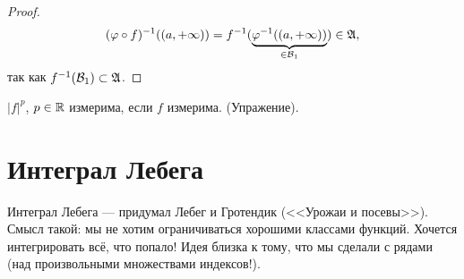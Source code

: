 \begin{proof}
 \begin{align*}
  (\varphi \circ f)^{-1} ((a, +\infty)) = f^{-1} ( \underbrace{\varphi^{-1}((a, +\infty))}_{\in \mathcal{B}_1} ) \in \mathfrak{A}
 ,\end{align*} так как $f^{-1}(\mathcal{B}_1) \subset \mathfrak{A}$.
\end{proof}
\begin{crly}
 $\left| f \right|^{p}$, $p \in \mathbb{R}$ измерима, если $f$ измерима. (Упражение).
\end{crly}

\section{Интеграл Лебега}

Интеграл Лебега --- придумал Лебег и Гротендик (<<Урожаи и посевы>>). Смысл такой: мы не хотим ограничиваться хорошими классами функций. Хочется интегрировать всё, что попало! Идея близка к тому, что мы сделали с рядами (над произвольными множествами индексов!).

